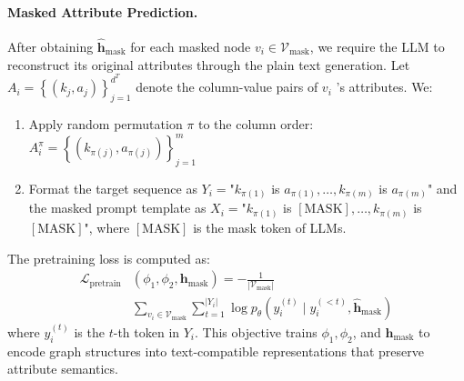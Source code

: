 \documentclass[11pt]{article}
\begin{document}
\paragraph{Masked Attribute Prediction.} After obtaining $\hat{\mathbf{h}}_{\text{mask}}$ for each masked node $v_i \in \mathcal{V}_{\text{mask}}$, we require the LLM to reconstruct its original attributes through the plain text generation. Let $A_i=\left\{\left(k_j, a_j\right)\right\}_{j=1}^{d^T}$ denote the column-value pairs of $v_i$ 's attributes. We:
\begin{enumerate}
\item Apply random permutation $\pi$ to the column order: $A_i^\pi=\left\{\left(k_{\pi(j)}, a_{\pi(j)}\right)\right\}_{j=1}^m$
\item Format the target sequence as $Y_i=$"$k_{\pi(1)}$ is $a_{\pi(1)}, \ldots , k_{\pi(m)}$ is $a_{\pi(m)}$" and the masked prompt template as $X_i=$"$k_{\pi(1)}$ is $\mathrm{[MASK]}, \ldots , k_{\pi(m)}$ is $\mathrm{[MASK]}$", where $\mathrm{[MASK]}$ is the mask token of LLMs.  
\end{enumerate}
The pretraining loss is computed as:
\begin{equation}
\begin{split}
    \mathcal{L}_{\text{pretrain}}&(\phi_1,\phi_2, \mathbf{h}_{\text{mask}}) = -\frac{1}{|\mathcal{V}_{\text{mask}}|}\\
    & \sum_{v_i \in \mathcal{V}_{\text{mask}}} \sum_{t=1}^{|Y_i|} \log p_\theta\left(y_i^{(t)} \mid y_i^{(<t)}, \hat{\mathbf{h}}_{\text{mask}}\right)
\end{split}
\end{equation}
where $y_i^{(t)}$ is the $t$-th token in $Y_i$. This objective trains $\phi_1, \phi_2$, and $\mathbf{h}_{\text{mask}}$ to encode graph structures into text-compatible representations that preserve attribute semantics.
\end{document}
